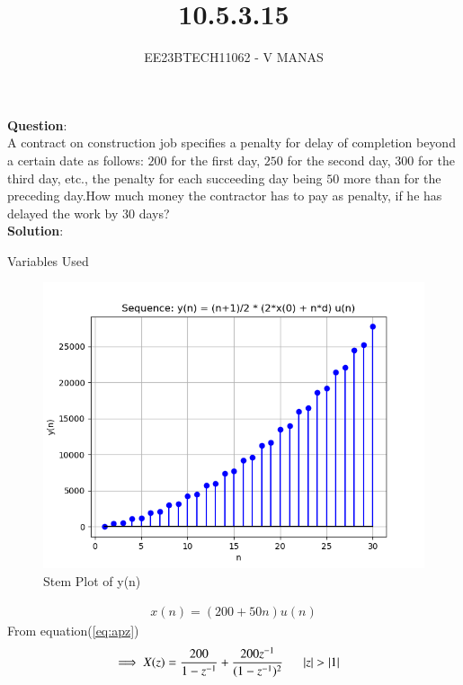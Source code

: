\documentclass[journal,12pt,twocolumn]{IEEEtran}
\theoremstyle{remark}
\begin{document}

\vspace{3cm}

\title{10.5.3.15}
\author{EE23BTECH11062 - V MANAS}
\maketitle
\newpage

\bigskip

\renewcommand{\thefigure}{\arabic{figure}}
\renewcommand{\thetable}{\arabic{table}}
\textbf{Question}:\\A contract on construction job specifies a penalty for delay of completion beyond a certain date as follows: \rupee $200$ for the first day, \rupee $250$ for the second day, \rupee $300$ for the third day, etc., the penalty for each succeeding day being \rupee $50$ more than for the preceding day.How much money the contractor has to pay as penalty, if he has delayed the work by $30$ days?\\
\textbf{Solution}:
\begin{table}[h]
    \centering
    
    \caption{Variables Used}
    \label{tab:table_10.5.3.15}
\end{table}
\begin{figure}[h]
    \centering
    \includegraphics[width=1.0\linewidth]{figs/graph.png}
    \caption{Stem Plot of y(n)}
    \label{stemplot1}
\end{figure}
\begin{align}
    x(n)=(200+50n)u(n)
\end{align}
From equation(\ref{eq:apz})
\begin{align}
\implies X(z)&=\frac{200}{1-z^{-1}}+\frac{200z^{-1}}{(1-z^{-1})^2}\:\:
\quad\left\vert z\right\vert>\left\vert1\right\vert
\end{align}
\end{document}
